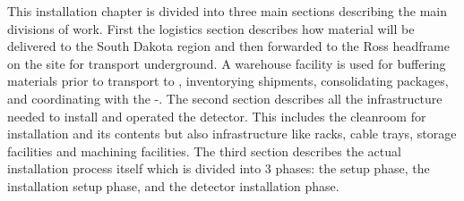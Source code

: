 This  installation chapter is divided into three main sections describing the main divisions of work. First the logistics section describes how material will be delivered to the South Dakota region and then forwarded to the Ross headframe on the  site for transport underground. A warehouse facility is used for buffering materials prior to transport to , inventorying shipments, consolidating packages, and coordinating with the  -. The second section describes all the infrastructure needed to install and operated the detector. This includes the cleanroom for installation and its contents but also infrastructure like racks, cable trays, storage facilities and machining facilities. The third section describes the actual installation process itself which is divided into 3 phases: the  setup phase, the installation setup phase, and the detector installation phase. 














